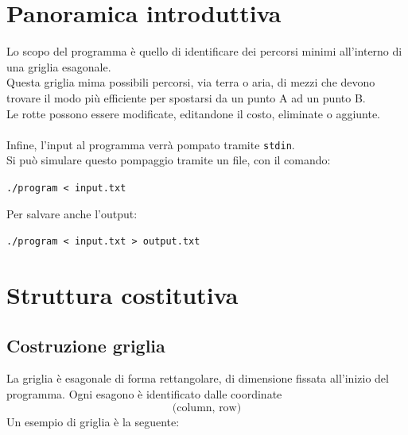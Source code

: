\documentclass{article}
\begin{document}
\graphicspath{{./images}}

\tableofcontents

\section{Panoramica introduttiva}
Lo scopo del programma è quello di identificare dei percorsi minimi all'interno di una griglia esagonale.\\
Questa griglia mima possibili percorsi, via terra o aria, di mezzi che devono trovare il modo più efficiente per spostarsi da un punto A ad un punto B.\\
Le rotte possono essere modificate, editandone il costo, eliminate o aggiunte.\\\\
Infine, l'input al programma verrà pompato tramite \texttt{stdin}.\\
Si può simulare questo pompaggio tramite un file, con il comando:
\begin{center}
    \texttt{./program < input.txt}
\end{center}
Per salvare anche l'output:
\begin{center}
    \begin{center}
    \texttt{./program < input.txt > output.txt}
\end{center}
\end{center}

\section{Struttura costitutiva}
\subsection{Costruzione griglia}
La griglia è esagonale di forma rettangolare, di dimensione fissata all'inizio del programma. Ogni esagono è identificato dalle coordinate
\[\text{(column, row)}\]
Un esempio di griglia è la seguente:

\begin{center}
\end{center}
\end{document}
